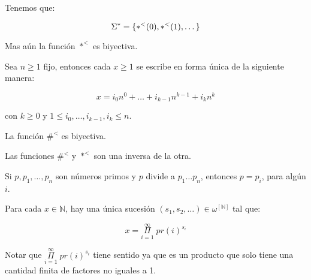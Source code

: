   \begin{lemma}
    \par Tenemos que:

    \[
      \Sigma^{\ast} = \{\ast^{<}(0), \ast^{<}(1), \dotsc\}
    \]

    \par Mas aún la función $\ast^{<}$ es biyectiva.
  \end{lemma}

  \begin{lemma}
    \par Sea $n \geq 1$ fijo, entonces cada $x \geq 1$ se escribe en forma única de la siguiente manera:

    \[
      x = i_{0} n^{0} + \dotsc + i_{k-1} n^{k-1} + i_{k} n^{k}
    \]

    \par con $k\geq 0$ y $1 \leq i_{0}, \dotsc, i_{k-1}, i_{k} \leq n$.
  \end{lemma}

  \begin{lemma}
    \par La función $\#^{<}$ es biyectiva.
  \end{lemma}

  \begin{lemma}
    \par Las funciones $\#^{<}$ y $\ast^{<}$ son una inversa de la otra.
  \end{lemma}

  \begin{lemma}
    \par Si $p, p_{1}, \dotsc, p_{n}$ son números primos y $p$ divide a $p_{1} \dotsc p_{n}$, entonces $p = p_{i}$,
    para algún $i$.
  \end{lemma}

  \begin{theorem}
    \par Para cada $x \in \mathbb{N}$, hay una única sucesión $(s_{1}, s_{2}, \dotsc) \in
    \omega^{\left[\mathbb{N}\right]}$ tal que:

    \[
      x = \underset{i=1}{\overset{\infty}{\Pi}} \; pr(i)^{s_{i}}
    \]

    \par Notar que $\underset{i=1}{\overset{\infty}{\Pi}} \; pr(i)^{s_{i}}$ tiene sentido ya que es un producto que solo
    tiene una cantidad finita de factores no iguales a 1.
  \end{theorem}

